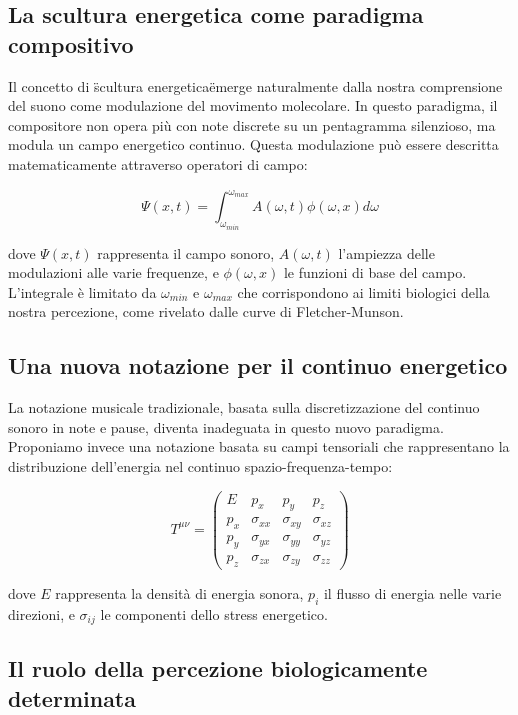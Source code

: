 \documentclass[a4paper,11pt]{article}
\begin{document}
\subsection{La scultura energetica come paradigma compositivo}

Il concetto di \"scultura energetica\" emerge naturalmente dalla nostra
comprensione del suono come modulazione del movimento molecolare. In
questo paradigma, il compositore non opera più con note discrete su un
pentagramma silenzioso, ma modula un campo energetico continuo. Questa
modulazione può essere descritta matematicamente attraverso operatori di
campo:

\begin{equation}
\Psi(x,t) = \int_{\omega_{min}}^{\omega_{max}} A(\omega,t)\phi(\omega,x)d\omega
\end{equation}


dove $\Psi(x,t)$ rappresenta il campo sonoro, $A(\omega,t)$ l'ampiezza
delle modulazioni alle varie frequenze, e $\phi(\omega,x)$ le funzioni
di base del campo. L'integrale è limitato da $\omega_{min}$ e
$\omega_{max}$ che corrispondono ai limiti biologici della nostra
percezione, come rivelato dalle curve di Fletcher-Munson.

\subsection{Una nuova notazione per il continuo energetico}

La notazione musicale tradizionale, basata sulla discretizzazione del
continuo sonoro in note e pause, diventa inadeguata in questo nuovo
paradigma. Proponiamo invece una notazione basata su campi tensoriali
che rappresentano la distribuzione dell'energia nel continuo
spazio-frequenza-tempo:

$$T^{\mu\nu} = \begin{pmatrix}
E & p_x & p_y & p_z \\
p_x & \sigma_{xx} & \sigma_{xy} & \sigma_{xz} \\
p_y & \sigma_{yx} & \sigma_{yy} & \sigma_{yz} \\
p_z & \sigma_{zx} & \sigma_{zy} & \sigma_{zz}
\end{pmatrix}$$

dove $E$ rappresenta la densità di energia sonora, $p_i$ il flusso di
energia nelle varie direzioni, e $\sigma_{ij}$ le componenti dello
stress energetico.

\subsection{Il ruolo della percezione biologicamente determinata}
\end{document}
